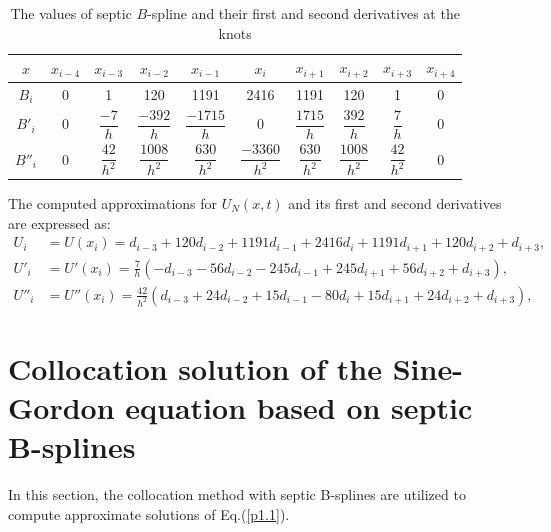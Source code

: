 \documentclass[10pt,letterpaper,twoside]{article}
\begin{document}
\begin{table}[H]
 \centering
 \caption{The values of septic \( B \)-spline and their first and second derivatives at the knots}
 \renewcommand{\arraystretch}{2.2}
 \setlength{\tabcolsep}{9pt}
 \setlength{\arrayrulewidth}{0.5pt}
 \begin{tabular}{|c|c|c|c|c|c|c|c|c|c|}
   \hline
   \( x \) & \( x_{i-4} \) & \( x_{i-3} \) & \( x_{i-2} \) & \( x_{i-1} \) & \( x_i \) & \( x_{i+1} \) & \( x_{i+2} \) & \( x_{i+3} \) & \( x_{i+4} \) \\  \hline
   \( B_i \) & 0 & 1 & 120 & 1191 & 2416 & 1191 & 120 & 1 & 0 \\ \hline
   \( B'_i \) & 0 & \(\dfrac{-7}{h}\) & \(\dfrac{-392}{h}\) & \(\dfrac{-1715}{h}\) & 0 & \(\dfrac{1715}{h}\) & \(\dfrac{392}{h}\) & \(\dfrac{7}{h}\) & 0 \\[2ex] \hline
   \( B''_i \) & 0 & \(\dfrac{42}{h^2}\) & \(\dfrac{1008}{h^2}\) & \(\dfrac{630}{h^2}\) & \(\dfrac{-3360}{h^2}\) & \(\dfrac{630}{h^2}\) & \(\dfrac{1008}{h^2}\) & \(\dfrac{42}{h^2}\) & 0 \\[2ex] \hline
  \end{tabular}
  \end{table}

The computed approximations for $U_{N}(x,t)$ and its first and second derivatives are expressed as:
\begin{equation}
\begin{aligned}
 U_i &= U(x_i) = d_{i-3} + 120d_{i-2} + 1191d_{i-1} + 2416d_i + 1191d_{i+1} + 120d_{i+2} + d_{i+3}, \\[2ex]
 U'_i &= U'(x_i) = \frac{7}{h}(-d_{i-3} - 56d_{i-2} - 245d_{i-1} + 245d_{i+1} + 56d_{i+2} + d_{i+3}), \\[2ex]
 U''_i &= U''(x_i) = \frac{42}{h^2}(d_{i-3} + 24d_{i-2} + 15d_{i-1} - 80d_i + 15d_{i+1} + 24d_{i+2} + d_{i+3}),
\end{aligned}
\label{4}
\end{equation}

\section{Collocation solution of the Sine-Gordon equation based on septic B-splines}
In this section, the collocation method with septic B-splines are utilized to compute approximate solutions of Eq.(\ref{p1.1}).
\end{document}
